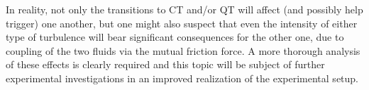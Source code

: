 In reality, not only the transitions to CT and/or QT will affect (and possibly help trigger) one another, but one might also suspect that even the intensity of either type of turbulence will bear significant consequences for the other one, due to coupling of the two fluids via the mutual friction force. A more thorough analysis of these effects is clearly required and this topic will be subject of further experimental investigations in an improved realization of the experimental setup.
